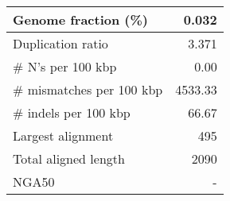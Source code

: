 \documentclass[12pt,a4paper]{article}
\begin{document}
\begin{table}[ht]
\begin{center}
\begin{tabular}{|l*{1}{|r}|}
Genome fraction (\%) & 0.032 \\ \hline
Duplication ratio & 3.371 \\ \hline
\# N's per 100 kbp & 0.00 \\ \hline
\# mismatches per 100 kbp & 4533.33 \\ \hline
\# indels per 100 kbp & 66.67 \\ \hline
Largest alignment & 495 \\ \hline
Total aligned length & 2090 \\ \hline
NGA50 & - \\ \hline
\end{tabular}
\end{center}
\end{table}
\end{document}
